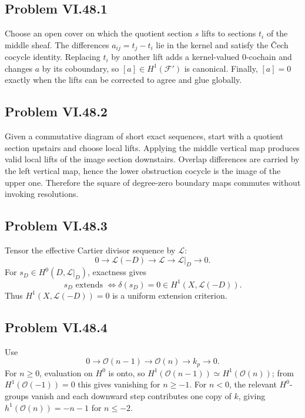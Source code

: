 \subsection*{Problem VI.48.1}
\begin{solution}
Choose an open cover on which the quotient section \(s\) lifts to sections \(t_i\) of the middle sheaf.  The differences \(a_{ij}=t_j-t_i\) lie in the kernel and satisfy the Čech cocycle identity.  Replacing \(t_i\) by another lift adds a kernel-valued \(0\)-cochain and changes \(a\) by its coboundary, so \([a]\in H^1(\mathcal F')\) is canonical.  Finally, \([a]=0\) exactly when the lifts can be corrected to agree and glue globally.
\end{solution}

\subsection*{Problem VI.48.2}
\begin{solution}
Given a commutative diagram of short exact sequences, start with a quotient section upstairs and choose local lifts.  Applying the middle vertical map produces valid local lifts of the image section downstairs.  Overlap differences are carried by the left vertical map, hence the lower obstruction cocycle is the image of the upper one.  Therefore the square of degree-zero boundary maps commutes without invoking resolutions.
\end{solution}

\subsection*{Problem VI.48.3}
\begin{solution}
Tensor the effective Cartier divisor sequence by \(\mathcal L\):
\[
0\to\mathcal L(-D)\to\mathcal L\to\mathcal L|_D\to0.
\]
For \(s_D\in H^0(D,\mathcal L|_D)\), exactness gives
\[
s_D\text{ extends }\Longleftrightarrow \delta(s_D)=0\in H^1(X,\mathcal L(-D)).
\]
Thus \(H^1(X,\mathcal L(-D))=0\) is a uniform extension criterion.
\end{solution}

\subsection*{Problem VI.48.4}
\begin{solution}
Use
\[
0\to\mathcal O(n-1)\to\mathcal O(n)\to k_p\to0.
\]
For \(n\ge0\), evaluation on \(H^0\) is onto, so \(H^1(\mathcal O(n-1))\simeq H^1(\mathcal O(n))\); from \(H^1(\mathcal O(-1))=0\) this gives vanishing for \(n\ge-1\).  For \(n<0\), the relevant \(H^0\)-groups vanish and each downward step contributes one copy of \(k\), giving \(h^1(\mathcal O(n))=-n-1\) for \(n\le-2\).
\end{solution}

